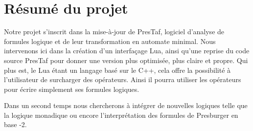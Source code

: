 \section{Résumé du projet}

Notre projet s'inscrit dans la mise-à-jour de PresTaf, logiciel d'analyse de formules logique et de leur transformation en automate minimal. Nous intervenons ici dans la création d'un interfaçage Lua, ainsi qu'une reprise du code source PresTaf pour donner une version plus optimisée, plus claire et propre. Qui plus est, le Lua étant un langage basé sur le C++, cela offre la possibilité à l'utilisateur de surcharger des opérateurs. Ainsi il pourra utiliser les opérateurs pour écrire simplement ses formules logiques.\\\par

Dans un second temps nous chercherons à intégrer de nouvelles logiques telle que la logique monadique ou encore l'interprétation des formules de Presburger en base -2.
